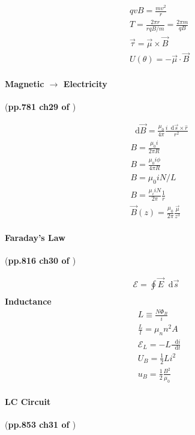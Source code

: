 \documentclass{article}
\newcommand*\diff{\mathop{}\!\mathrm{d}}
\numberwithin{equation}{subsection} %
\theoremstyle{definition}
\begin{document}
\begin{align}
    & qvB = \frac{mv^2}{r} \\
    & T = \frac{2\pi r}{ rqB / m} = \frac{2\pi m}{qB} \\
    & \vec\tau = \vec{\mu} \times \vec{B} \\
    & U(\theta) = -\vec\mu \cdot \vec B
\end{align}

\paragraph{Magnetic $\to$ Electricity} (\textbf{pp.781 ch29 of
\cite{book}})

\begin{align}
    & \diff \vec{B} = \frac{\mu_0}{4\pi}
        \frac{i\diff \vec{s}\times\hat{r}}{r^2} \\
    & B = \frac{\mu_0 i}{2\pi R} \\
    & B = \frac{\mu_0 i \phi}{4\pi R} \\
    & B = \mu_0 i N/L \\
    & B = \frac{\mu_i i N}{2\pi}\frac{1}{r} \\
    & \vec{B}(z) = \frac{\mu_0}{2\pi}\frac{\vec{\mu}}{z^3}
\end{align}

\paragraph{Faraday's Law} (\textbf{pp.816 ch30 of \cite{book}})

\begin{align}
    \mathcal{E} = \oint \vec{E} \diff \vec{s} \\
\end{align}
\textbf{Inductance}
\begin{align}
    & L \equiv \frac{N\Phi_B}{i} \\
    & \frac{L}{l} = \mu_n n^2 A \\
    & \mathcal{E}_L = - L\frac{\diff i}{\diff t} \\
    & U_B = \frac{1}{2} L i^2 \\
    & u_B = \frac{1}{2} \frac{B^2}{\mu_0} 
\end{align}

\paragraph{LC Circuit} (\textbf{pp.853 ch31 of \cite{book}})
\end{document}
